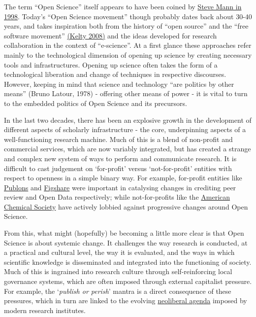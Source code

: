 \documentclass[]{book}
\begin{document}
{{The term ``Open Science'' itself appears to have been coined by \href{https://en.wikipedia.org/wiki/Open_science\#Coining_of_phrase_\%22OpenScience\%22}{Steve Mann in 1998}. Today's ``Open Science movement'' though probably dates back about 30-40 years, and takes inspiration both from the history of ``open source'' and the ``free software movement'' \href{https://www.twobits.net/pub/Kelty-TwoBits.pdf}{(Kelty 2008)} and the ideas developed for research collaboration in the context of ``e-science''. At a first glance these approaches refer mainly to the technological dimension of opening up science by creating necessary tools and infrastructures. Opening up science often takes the form of a technological liberation and change of techniques in respective discourses. However, keeping in mind that science and technology ``are politics by other means'' (Bruno Latour, 1978) - offering other means of power - it is vital to turn to the embedded politics of Open Science and its precursors.

In the last two decades, there has been an explosive growth in the development of different aspects of scholarly infrastructure - the core, underpinning aspects of a well-functioning research machine. Much of this is a blend of non-profit and commercial services, which are now variably integrated, but has created a strange and complex new system of ways to perform and communicate research. It is difficult to cast judgement on `for-profit' versus `not-for-profit' entities with respect to openness in a simple binary way. For example, for-profit entities like \href{https://publons.com/}{Publons} and \href{https://figshare.com/}{Figshare} were important in catalysing changes in crediting peer review and Open Data respectively; while not-for-profits like the \href{https://www.scientificamerican.com/article/open-access-to-science-un/}{American Chemical Society} have actively lobbied against progressive changes around Open Science.

From this, what might (hopefully) be becoming a little more clear is that Open Science is about systemic change. It challenges the way research is conducted, at a practical and cultural level, the way it is evaluated, and the ways in which scientific knowledge is disseminated and integrated into the functioning of society. Much of this is ingrained into research culture through self-reinforcing local governance systems, which are often imposed through external capitalist pressure. For example, the `\emph{publish or perish}' mantra is a direct consequence of these pressures, which in turn are linked to the evolving \href{https://opinionator.blogs.nytimes.com/2009/03/08/neoliberalism-and-higher-education/}{neoliberal agenda} imposed by modern research institutes.

}}
\end{document}
